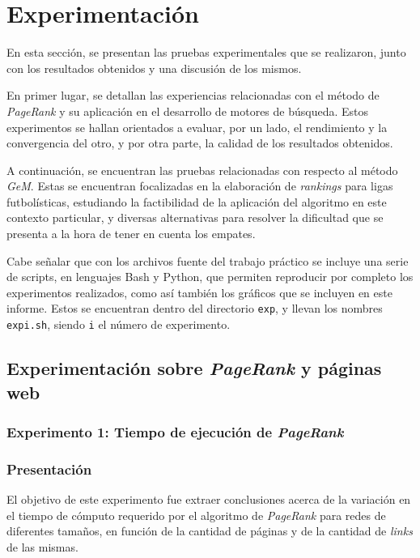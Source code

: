 \section{Experimentación}

    En esta sección, se presentan las pruebas experimentales que se realizaron, junto con los resultados obtenidos y una discusión de los mismos.

    En primer lugar, se detallan las experiencias relacionadas con el método de \emph{PageRank} y su aplicación en el desarrollo de motores de búsqueda. Estos experimentos se hallan orientados a evaluar, por un lado, el rendimiento y la convergencia del otro, y por otra parte, la calidad de los resultados obtenidos.

    A continuación, se encuentran las pruebas relacionadas con respecto al método \emph{GeM}. Estas se encuentran focalizadas en la elaboración de \emph{rankings} para ligas futbolísticas, estudiando la factibilidad de la aplicación del algoritmo en este contexto particular, y diversas alternativas para resolver la dificultad que se presenta a la hora de tener en cuenta los empates.

    Cabe señalar que con los archivos fuente del trabajo práctico se incluye una serie de scripts, en lenguajes Bash y Python, que permiten reproducir por completo los experimentos realizados, como así también los gráficos que se incluyen en este informe. Estos se encuentran dentro del directorio \texttt{exp}, y llevan los nombres \texttt{exp{i}.sh}, siendo \texttt{i} el número de experimento.

    \subsection{Experimentación sobre \emph{PageRank} y páginas web}

        \subsubsection{Experimento 1: Tiempo de ejecución de \emph{PageRank}}

            \subsubsection*{Presentación}
                El objetivo de este experimento fue extraer conclusiones acerca de la variación en el tiempo de cómputo requerido por el algoritmo de \emph{PageRank} para redes de diferentes tamaños, en función de la cantidad de páginas y de la cantidad de \emph{links} de las mismas.

